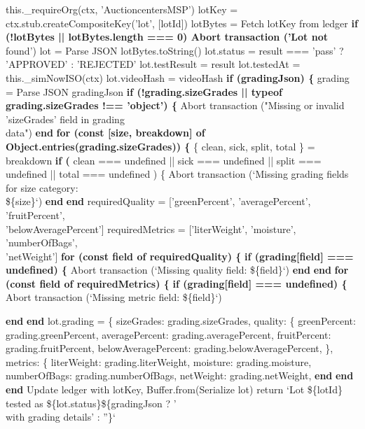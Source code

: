 \documentclass[12pt]{article}
\begin{document}
\begin{algorithm}[H]
\caption{testCardamom() (Part 1 of 2)}
this.\_requireOrg(ctx, 'AuctioncentersMSP')\;
lotKey = ctx.stub.createCompositeKey('lot', [lotId])\;
lotBytes = Fetch lotKey from ledger\;
\textbf{if (!lotBytes || lotBytes.length === 0) Abort transaction ('Lot not}\\
\quad found')\;
lot = Parse JSON lotBytes.toString()\;
lot.status = result === 'pass' ? 'APPROVED' : 'REJECTED'\;
lot.testResult = result\;
lot.testedAt = this.\_simNowISO(ctx)\;
lot.videoHash = videoHash\;
\textbf{if (gradingJson) \{}\;
grading = Parse JSON gradingJson\;
\textbf{if (!grading.sizeGrades || typeof grading.sizeGrades !== 'object') \{}\;
Abort transaction ("Missing or invalid 'sizeGrades' field in grading\\
\quad data")\;
\textbf{end}\;
\textbf{for (const [size, breakdown] of Object.entries(grading.sizeGrades)) \{}\;
\{ clean, sick, split, total \} = breakdown\;
\textbf{if (}\;
clean === undefined ||\;
sick === undefined ||\;
split === undefined ||\;
total === undefined\;
) \{\;
Abort transaction (`Missing grading fields for size category:\\
\quad \$\{size\}`)\;
\textbf{end}\;
\textbf{end}\;
requiredQuality = ['greenPercent', 'averagePercent', 'fruitPercent',\\
\quad 'belowAveragePercent']\;
requiredMetrics = ['literWeight', 'moisture', 'numberOfBags',\\
\quad 'netWeight']\;
\textbf{for (const field of requiredQuality) \{}\;
\textbf{if (grading[field] === undefined) \{}\;
Abort transaction (`Missing quality field: \$\{field\}`)\;
\textbf{end}\;
\textbf{end}\;
\textbf{for (const field of requiredMetrics) \{}\;
\textbf{if (grading[field] === undefined) \{}\;
Abort transaction (`Missing metric field: \$\{field\}`)\;
\end{algorithm}


\begin{algorithm}[H]
\caption{testCardamom() (Part 2 of 2)}
\textbf{end}\;
\textbf{end}\;
lot.grading = \{\;
sizeGrades: grading.sizeGrades,\;
quality: \{\;
greenPercent: grading.greenPercent,\;
averagePercent: grading.averagePercent,\;
fruitPercent: grading.fruitPercent,\;
belowAveragePercent: grading.belowAveragePercent,\;
\},\;
metrics: \{\;
literWeight: grading.literWeight,\;
moisture: grading.moisture,\;
numberOfBags: grading.numberOfBags,\;
netWeight: grading.netWeight,\;
\textbf{end}\;
\textbf{end}\;
\textbf{end}\;
Update ledger with lotKey, Buffer.from(Serialize lot)\;
return `Lot \$\{lotId\} tested as \$\{lot.status\}\$\{gradingJson ? '\\
\quad with grading details' : ''\}`\;
\end{algorithm}
\end{document}
